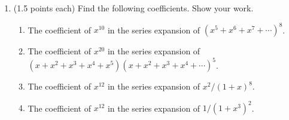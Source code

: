 \documentclass[11pt]{article}
\begin{document}
\begin{enumerate}
\begin{enumerate}
\end{enumerate}

\item (1.5 points each) Find the following coefficients.  Show your work.
\begin{enumerate}
\item The coefficient of $x^{10}$ in the series expansion of 
$(x^5+x^6 + x^7+ \cdots)^8$.
\item The coefficient of $x^{20}$ in the series expansion of 
$(x+x^2 + x^3+x^4+x^5) (x+x^2 + x^3+x^4+\cdots)^5 $.
\item The coefficient of $x^{12}$ in the series expansion of
$x^2/(1+x)^8$.
\item The coefficient of $x^{12}$ in the series expansion of
$1/(1+x^3)^2$.
\end{enumerate}

\end{enumerate}
\end{document}
